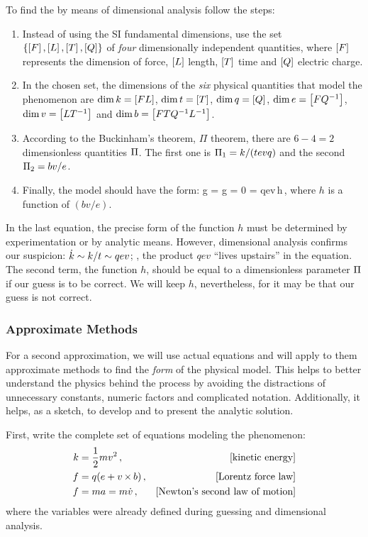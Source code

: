 To find the  by means of dimensional analysis follow the steps:
%
\begin{enumerate}
\item Instead of using the SI fundamental dimensions, use the set $\left\lbrace{\left[{F}\right], \left[{L}\right], \left[{T}\right], \left[{Q}\right]}\right\rbrace$ of \emph{four} dimensionally independent quantities, where $\left[{F}\right]$ represents the dimension of force, $\left[{L}\right]$ length, $\left[{T}\right]$ time and $\left[{Q}\right]$ electric charge.
%
\item In the chosen set, the dimensions of the \emph{six} physical quantities that model the phenomenon are $\dim k = \left[{FL}\right]$, $\dim t = \left[{T}\right]$, $\dim q = \left[{Q}\right]$, $\dim e = \left[{FQ^{-1}}\right]$, $\dim v = \left[{LT^{-1}}\right]$ and $\dim b = \left[{FTQ^{-1}L^{-1}}\right]$.
%
\item According to the Buckinham's theorem, \aka $\Pi$ theorem, there are $6 - 4 = 2$ dimensionless quantities $\Pi$. The first one is $\Pi_1 = k/(tevq)$ and the second $\Pi_2 = bv/e$.
%
\item Finally, the model should have the form:
\beq
g = g = 0 \implies {} = qev\,h\,,
\eeq
where $h$ is a function of $(bv/e)$.
\end{enumerate}

In the last equation, the precise form of the function $h$ must be determined by experimentation or by analytic means. However, dimensional analysis confirms our suspicion: $\dot{k}\sim k/t \sim qev$; \ie, the product $qev$ ``lives upstairs'' in the equation. The second term, the function $h$, should be equal to a dimensionless parameter $\Pi$ if our guess is to be correct. We will keep $h$, nevertheless, for it may be that our guess is not correct.


\subsubsection{Approximate Methods}
For a second approximation, we will use actual equations and will apply to them approximate methods to find the \emph{form} of the physical model. This helps to better understand the physics behind the process by avoiding the distractions of unnecessary constants, numeric factors and complicated notation. Additionally, it helps, as a sketch, to develop and to present the analytic solution.

First, write the complete set of equations modeling the phenomenon:
\begin{align*}
k &= \dfrac{1}{2}mv^2\,, &\text{[{kinetic energy}]}\\
f &= q(e + v\operatorname{\times} b)\,, &\text{[{Lorentz force law}]}\\
f &= ma = m\dot{v}\,,      &\text{[{Newton's second law of motion}]}
\end{align*}
where the variables were already defined during guessing and dimensional analysis.

